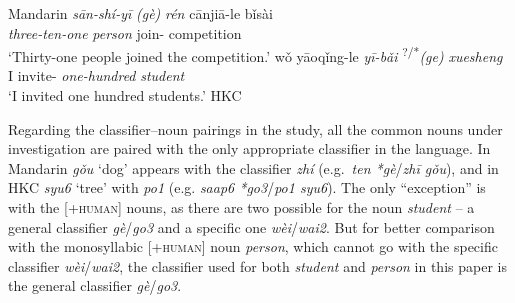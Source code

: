 \documentclass[output=paper]{langsci/langscibook}
\begin{document}
\ea\label{ex:23.6} Mandarin %
	\ea
        \gll    \textit{sān-shí-yī} \textit{(gè)} \textit{rén} cānjiā-le bǐsài\\
                \textit{three-ten-one} \hphantom{\textit{(}}\textit{\Clf}{} \textit{person} join-\Pfv{} competition\\
	    \glt    ‘Thirty-one people joined the competition.’
	\ex
        \gll    wǒ yāoqǐng-le \textit{yī-bǎi} \textsuperscript{?/*}\textit{(ge)} \textit{xuesheng}\\
                I  invite-\Pfv{} \textit{one-hundred} \textit{\Clf} \textit{student}\\
	    \glt    ‘I invited one hundred students.’
	\z
\ex \label{ex:23.7} \gls{HKC} %
	\z
\z

Regarding the classifier--noun pairings in the study, all the common nouns
under investigation are paired with the only appropriate
classifier in the language. In Mandarin \emph{gǒu}
‘dog’ appears with the classifier \emph{zhí} (e.g.\ \emph{ten
*gè}/\emph{zhī gǒu}), and in \gls{HKC} \emph{syu6}
‘tree’ with \emph{po1} (e.g. \emph{saap6 *go3}/\emph{po1 syu6}). The only
\enquote{exception} is with the [+\textsc{human}] nouns, as there are two
possible  for the noun \emph{student} -- a general classifier
\emph{gè}/\emph{go3} and a specific one \emph{wèi}/\emph{wai2}. But for better
comparison with the monosyllabic [+\textsc{human}] noun \emph{person}, which
cannot go with the specific classifier \emph{wèi}/\emph{wai2},
the classifier used for both \emph{student} and \emph{person}
in this paper is the general classifier \emph{gè}/\emph{go3}.
\end{document}
